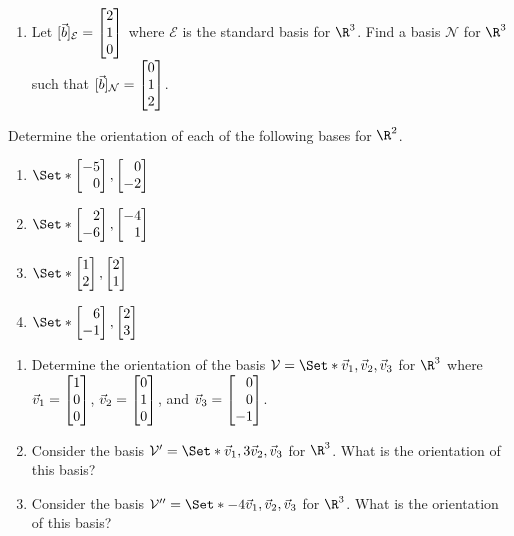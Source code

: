 \begin{exercises}
\begin{problist}
\begin{enumerate}
			\item Let $[\vec b]_{\mathcal E}=\mat{2\\1\\0}$ where $\mathcal
				E$ is the standard basis for $\R^{3}$. Find a
				basis $\mathcal N$ for $\R^{3}$ such that
				$[\vec b]_{\mathcal N}=\mat{0\\1\\2}$.
		\end{enumerate}

		\prob Determine the orientation of each of the following bases
		for $\R^{2}$.
		\begin{enumerate}
			\item $\Set*{\mat{-5\\0},\mat{0\\-2}}$

			\item $\Set*{\mat{2\\-6},\mat{-4\\1}}$

			\item $\Set*{\mat{1\\2},\mat{2\\1}}$

			\item $\Set*{\mat{6\\-1},\mat{2\\3}}$
		\end{enumerate}

		\prob
		\begin{enumerate}
			\item Determine the orientation of the basis $\mathcal V
				= \Set*{\vec v_1, \vec v_2, \vec v_3}$ for $\R^{3}$
				where $\vec v_{1} = \mat{1\\0\\0}$,
				$\vec v_{2} = \mat{0\\1\\0}$, and $\vec v_{3} =
				\mat{0\\0\\-1}$.

			\item Consider the basis $\mathcal V' = \Set*{\vec v_1,
				3\vec v_2, \vec v_3}$ for $\R^{3}$. What is the
				orientation of this basis?

			\item Consider the basis $\mathcal V'' = \Set*{-4\vec v_1,
				\vec v_2, \vec v_3}$ for $\R^{3}$. What is the
				orientation of this basis?
		\end{enumerate}


\end{problist}
\end{exercises}
